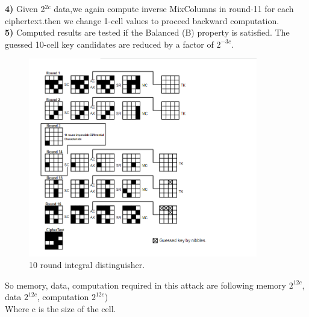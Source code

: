 \documentclass[preprint]{transcrypto}
\begin{document}
{\textbf{4)} Given 2$^{2c}$ data,we again compute inverse MixColumns in round-11 for each ciphertext.then
we change 1-cell values to proceed backward computation.\\
\textbf{5)} Computed results are tested if the Balanced (B) property is satisfied. The guessed
10-cell key candidates are reduced by a factor of $2^{-3c}$.\\
\begin{figure}[H]
	\centering
	\caption{10 round integral distinguisher.}
	\includegraphics[width=10cm]{fig4.png}
\end{figure}
So memory, data, computation required in this attack are following
memory $2^{12c}$, data $2^{12c}$, computation $2^{12c}$)\\
Where c is the size of the cell.
}
\end{document}
